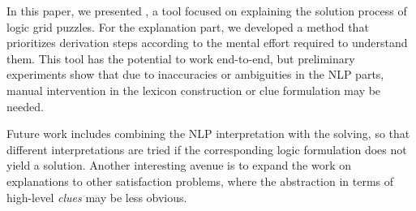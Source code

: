 
In this paper, we presented \ourtool, a tool focused on explaining the solution process of logic grid puzzles.
For the explanation part, we developed a method that prioritizes derivation steps according to the mental effort required to understand them. 
This tool has the potential to work end-to-end, but preliminary experiments show that due to inaccuracies or ambiguities in the NLP parts, manual intervention in the lexicon construction or clue formulation may be needed. 

Future work includes combining the NLP interpretation with the solving, so that different interpretations are tried if the corresponding logic formulation does not yield a solution. Another interesting avenue is to expand the work on explanations to other satisfaction problems, where the abstraction in terms of high-level \textit{clues} may be less obvious.
